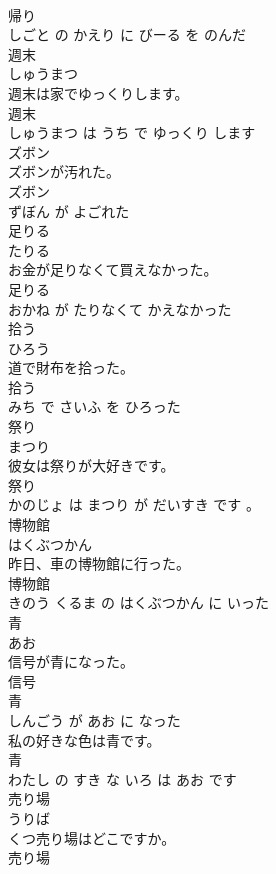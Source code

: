 \documentclass[8pt]{extreport}
\begin{document}
\begin{CJK}{UTF8}{min}
\\	帰り 
\\	しごと の かえり に びーる を のんだ			
\\	週末	
\\	しゅうまつ			
\\	週末は家でゆっくりします。	
\\	週末 
\\	しゅうまつ は うち で ゆっくり します			
\\	ズボン	
\\	ズボンが汚れた。	
\\	ズボン 
\\	ずぼん が よごれた			
\\	足りる	
\\	たりる			
\\	お金が足りなくて買えなかった。	
\\	足りる 
\\	おかね が たりなくて かえなかった			
\\	拾う	
\\	ひろう			
\\	道で財布を拾った。	
\\	拾う 
\\	みち で さいふ を ひろった			
\\	祭り	
\\	まつり			
\\	彼女は祭りが大好きです。	
\\	祭り 
\\	かのじょ は まつり が だいすき です 。			
\\	博物館	
\\	はくぶつかん			
\\	昨日、車の博物館に行った。	
\\	博物館 
\\	きのう くるま の はくぶつかん に いった			
\\	青	
\\	あお			
\\	信号が青になった。	
\\	信号 
\\	青 
\\	しんごう が あお に なった			
\\	私の好きな色は青です。	
\\	青 
\\	わたし の すき な いろ は あお です			
\\	売り場	
\\	うりば			
\\	くつ売り場はどこですか。	
\\	売り場 

\end{CJK}
\end{document}
